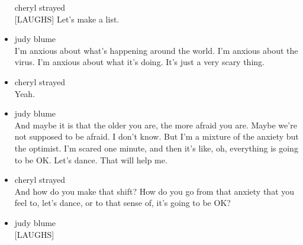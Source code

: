 \begin{itemize}
  cheryl strayed\\
  {[}LAUGHS{]} Let's make a list.
\item
  judy blume\\
  I'm anxious about what's happening around the world. I'm anxious about
  the virus. I'm anxious about what it's doing. It's just a very scary
  thing.
\item
  cheryl strayed\\
  Yeah.
\item
  judy blume\\
  And maybe it is that the older you are, the more afraid you are. Maybe
  we're not supposed to be afraid. I don't know. But I'm a mixture of
  the anxiety but the optimist. I'm scared one minute, and then it's
  like, oh, everything is going to be OK. Let's dance. That will help
  me.
\item
  cheryl strayed\\
  And how do you make that shift? How do you go from that anxiety that
  you feel to, let's dance, or to that sense of, it's going to be OK?
\item
  judy blume\\
  {[}LAUGHS{]}


\end{itemize}
